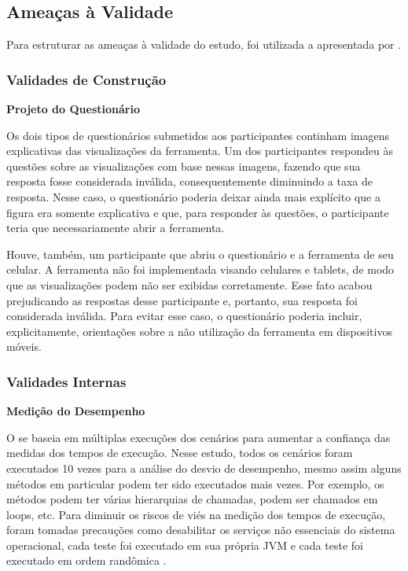 \subsection{Ameaças à Validade} \label{avaliacao-consideracoes-ameacas-validade}

Para estruturar as ameaças à validade do estudo, foi utilizada a apresentada por \citeauthor{wohlin2012experimentation}.

\subsubsection{Validades de Construção}

\noindent \textbf{Projeto do Questionário}

Os dois tipos de questionários submetidos aos participantes continham imagens explicativas das visualizações da ferramenta. Um dos participantes respondeu às questões sobre as visualizações com base nessas imagens, fazendo que sua resposta fosse considerada inválida, consequentemente diminuindo a taxa de resposta. Nesse caso, o questionário poderia deixar ainda mais explícito que a figura era somente explicativa e que, para responder às questões, o participante teria que necessariamente abrir a ferramenta.

Houve, também, um participante que abriu o questionário e a ferramenta de seu celular. A ferramenta não foi implementada visando celulares e tablets, de modo que as visualizações podem não ser exibidas corretamente. Esse fato acabou prejudicando as respostas desse participante e, portanto, sua resposta foi considerada inválida. Para evitar esse caso, o questionário poderia incluir, explicitamente, orientações sobre a não utilização da ferramenta em dispositivos móveis.

\subsubsection{Validades Internas}

\noindent \textbf{Medição do Desempenho}

O \textit{\perfMinerName} se baseia em múltiplas execuções dos cenários para aumentar a confiança das medidas dos tempos de execução. Nesse estudo, todos os cenários foram executados 10 vezes para a análise do desvio de desempenho, mesmo assim alguns métodos em particular podem ter sido executados mais vezes. Por exemplo, os métodos podem ter várias hierarquias de chamadas, podem ser chamados em loops, etc. Para diminuir os riscos de viés na medição dos tempos de execução, foram tomadas precauções como desabilitar os serviços não essenciais do sistema operacional, cada teste foi executado em sua própria JVM e cada teste foi executado em ordem randômica \cite{Pinto2015}.

